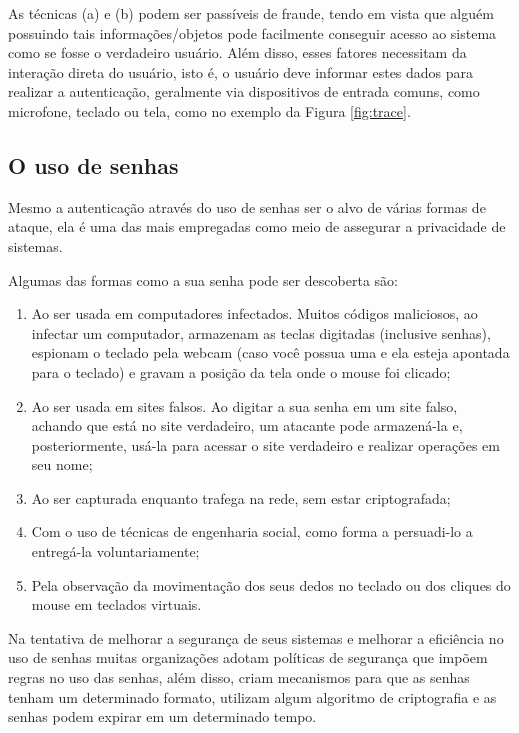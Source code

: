 As técnicas (a) e (b) podem ser passíveis de fraude, tendo em vista que alguém possuindo tais informações/objetos pode facilmente conseguir acesso ao sistema como se fosse o verdadeiro usuário. Além disso, esses fatores necessitam da interação direta do usuário, isto é, o usuário deve informar estes dados para realizar a autenticação, geralmente via dispositivos de entrada comuns, como microfone, teclado ou tela, como no exemplo da Figura \ref{fig:trace}.

\subsection{O uso de senhas}
Mesmo a autenticação através do uso de senhas ser o alvo de várias formas de ataque, ela é uma das mais empregadas como meio de assegurar a privacidade de sistemas.
\begin{citacao}
Algumas das formas como a sua senha pode ser descoberta são:
	\begin{footnotesize}
		\begin{enumerate}
		\item Ao ser usada em computadores infectados. Muitos códigos maliciosos, ao infectar um computador, armazenam as teclas digitadas (inclusive senhas), espionam o teclado pela webcam (caso você possua uma e ela esteja apontada para o teclado) e gravam a posição da tela onde o mouse foi clicado;
		\item Ao ser usada em sites falsos. Ao digitar a sua senha em um site falso, achando que está no site verdadeiro, um atacante pode armazená-la e, posteriormente, usá-la para acessar o site verdadeiro e realizar operações em seu nome;
		\item Ao ser capturada enquanto trafega na rede, sem estar criptografada;
		\item Com o uso de técnicas de engenharia social, como forma a persuadi-lo a entregá-la voluntariamente;
		\item Pela observação da movimentação dos seus dedos no teclado ou dos cliques do mouse em teclados virtuais.
		\cite{Cert2016}
		\end{enumerate}
	\end{footnotesize}
\end{citacao}

Na tentativa de melhorar a segurança de seus sistemas e melhorar a eficiência no uso de senhas muitas organizações adotam políticas de segurança que impõem regras no uso das senhas, além disso, criam mecanismos para que as senhas tenham um determinado formato, utilizam algum algoritmo de criptografia e as senhas podem expirar em um determinado tempo.

